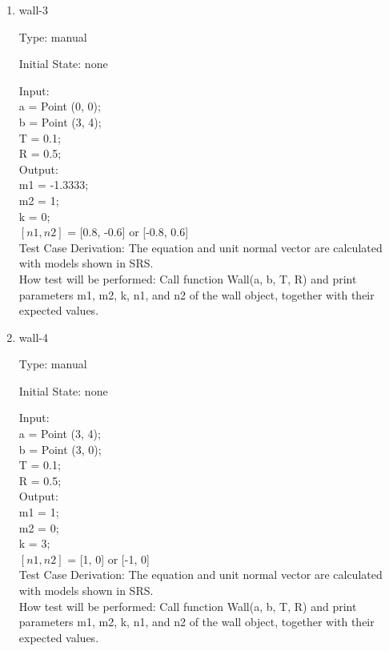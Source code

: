 \documentclass[12pt, titlepage]{article}
\begin{document}
\begin{enumerate}
\item{wall-3\\}

Type: manual
					
Initial State: none
					
Input: \\
a = Point (0, 0);\\
b = Point (3, 4);\\
T = 0.1;\\
R = 0.5;\\
					
Output: \\
m1 = -1.3333;\\
m2 = 1;\\
k = 0;\\
$\left[n1 , n2\right]$ = [0.8, -0.6] or [-0.8, 0.6]\\

Test Case Derivation: The equation and unit normal vector are calculated with models shown in SRS.\\

How test will be performed: Call function Wall(a, b, T, R) and print parameters m1, m2, k, n1, and  n2 of the wall object, together with their expected values.

\item{wall-4\\}

Type: manual
					
Initial State: none
					
Input: \\
a = Point (3, 4);\\
b = Point (3, 0);\\
T = 0.1;\\
R = 0.5;\\
					
Output: \\
m1 = 1;\\
m2 = 0;\\
k = 3;\\
$\left[n1 , n2\right]$ = [1, 0] or [-1, 0]\\

Test Case Derivation: The equation and unit normal vector are calculated with models shown in SRS.\\

How test will be performed: Call function Wall(a, b, T, R) and print parameters m1, m2, k, n1, and  n2 of the wall object, together with their expected values.
    
\end{enumerate}
\end{document}
